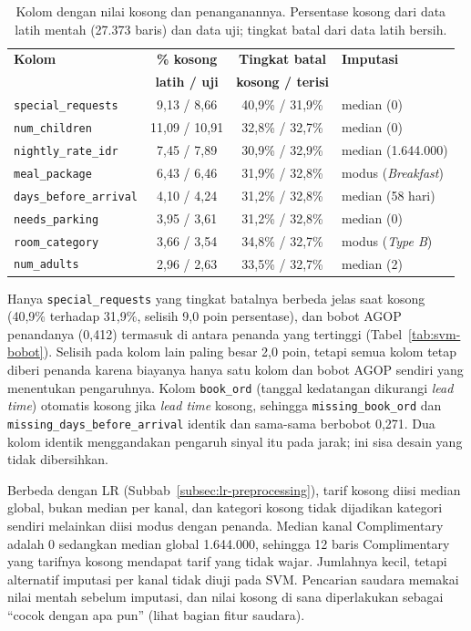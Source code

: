 \begin{table}[H]
	\centering
	\caption{Kolom dengan nilai kosong dan penanganannya. Persentase kosong dari data latih mentah (27.373 baris) dan data uji; tingkat batal dari data latih bersih.}
	\label{tab:svm-missing}
	\small
	\begin{tabular}{l c c l}
		\toprule
		\textbf{Kolom} & \textbf{\% kosong} & \textbf{Tingkat batal} & \textbf{Imputasi} \\
		& \textbf{latih / uji} & \textbf{kosong / terisi} & \\
		\midrule
		\texttt{special\_requests} & 9,13 / 8,66 & 40,9\% / 31,9\% & median (0) \\
		\texttt{num\_children} & 11,09 / 10,91 & 32,8\% / 32,7\% & median (0) \\
		\texttt{nightly\_rate\_idr} & 7,45 / 7,89 & 30,9\% / 32,9\% & median (1.644.000) \\
		\texttt{meal\_package} & 6,43 / 6,46 & 31,9\% / 32,8\% & modus (\textit{Breakfast}) \\
		\texttt{days\_before\_arrival} & 4,10 / 4,24 & 31,2\% / 32,8\% & median (58 hari) \\
		\texttt{needs\_parking} & 3,95 / 3,61 & 31,2\% / 32,8\% & median (0) \\
		\texttt{room\_category} & 3,66 / 3,54 & 34,8\% / 32,7\% & modus (\textit{Type B}) \\
		\texttt{num\_adults} & 2,96 / 2,63 & 33,5\% / 32,7\% & median (2) \\
		\bottomrule
	\end{tabular}
\end{table}

Hanya \texttt{special\_requests} yang tingkat batalnya berbeda jelas saat kosong (40,9\% terhadap 31,9\%, selisih 9,0 poin persentase), dan bobot AGOP penandanya (0,412) termasuk di antara penanda yang tertinggi (Tabel~\ref{tab:svm-bobot}). Selisih pada kolom lain paling besar 2,0 poin, tetapi semua kolom tetap diberi penanda karena biayanya hanya satu kolom dan bobot AGOP sendiri yang menentukan pengaruhnya. Kolom \texttt{book\_ord} (tanggal kedatangan dikurangi \textit{lead time}) otomatis kosong jika \textit{lead time} kosong, sehingga \texttt{missing\_book\_ord} dan \texttt{missing\_days\_before\_arrival} identik dan sama-sama berbobot 0,271. Dua kolom identik menggandakan pengaruh sinyal itu pada jarak; ini sisa desain yang tidak dibersihkan.

Berbeda dengan LR (Subbab~\ref{subsec:lr-preprocessing}), tarif kosong diisi median global, bukan median per kanal, dan kategori kosong tidak dijadikan kategori sendiri melainkan diisi modus dengan penanda. Median kanal Complimentary adalah 0 sedangkan median global 1.644.000, sehingga 12 baris Complimentary yang tarifnya kosong mendapat tarif yang tidak wajar. Jumlahnya kecil, tetapi alternatif imputasi per kanal tidak diuji pada SVM. Pencarian saudara memakai nilai mentah sebelum imputasi, dan nilai kosong di sana diperlakukan sebagai ``cocok dengan apa pun'' (lihat bagian fitur saudara).

